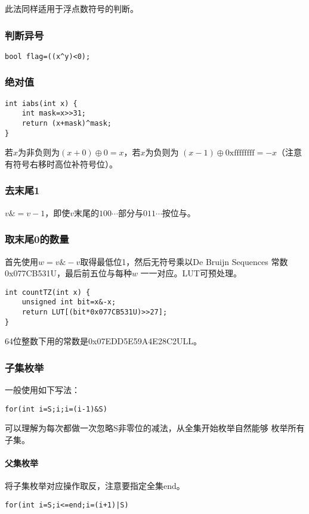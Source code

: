 此法同样适用于浮点数符号的判断。
\subsubsection{判断异号}
\begin{lstlisting}
bool flag=((x^y)<0);
\end{lstlisting}
\subsubsection{绝对值}
\begin{lstlisting}
int iabs(int x) {
    int mask=x>>31;
    return (x+mask)^mask;
}
\end{lstlisting}

若$x$为非负则为$(x+0)\oplus 0=x$，若$x$为负则为
$(x-1)\oplus \textrm{0xffffffff}=-x$（注意有符号右移时高位补符号位）。
\subsubsection{去末尾1}
$v\&=v-1$，即使$v$末尾的$100\cdots$部分与$011\cdots$按位与。
\subsubsection{取末尾0的数量}
首先使用$w=v\&-v$取得最低位1，然后无符号乘以De Bruijn Sequences
常数0x077CB531U，最后前五位与每种$w$
一一对应。LUT可预处理。
\begin{lstlisting}
int countTZ(int x) {
    unsigned int bit=x&-x;
    return LUT[(bit*0x077CB531U)>>27];
}
\end{lstlisting}

64位整数下用的常数是0x07EDD5E59A4E28C2ULL。
\subsubsection{子集枚举}
一般使用如下写法：
\begin{lstlisting}
for(int i=S;i;i=(i-1)&S)
\end{lstlisting}

可以理解为每次都做一次忽略S非零位的减法，从全集开始枚举自然能够
枚举所有子集。
\paragraph{父集枚举}
将子集枚举对应操作取反，注意要指定全集end。
\begin{lstlisting}
for(int i=S;i<=end;i=(i+1)|S)
\end{lstlisting}
